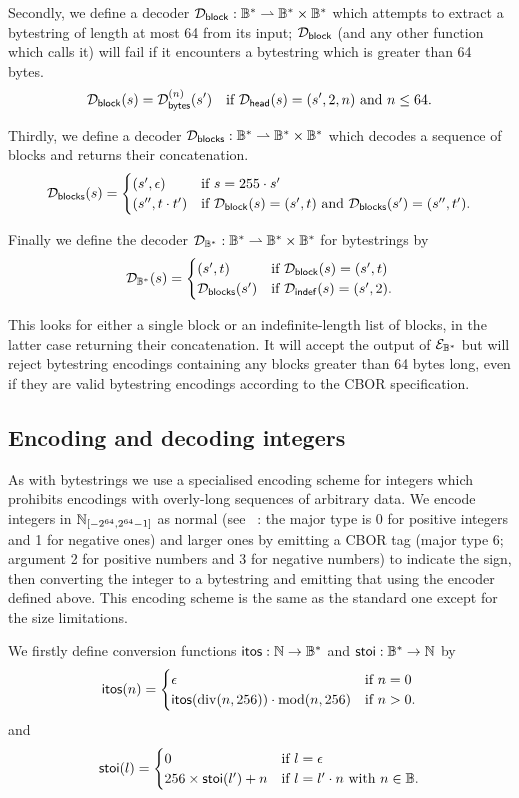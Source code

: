\noindent Secondly, we define a decoder $\mathcal{D}_{\mathsf{block}}: \mathbb{B}^* \rightharpoonup \mathbb{B}^*
\times \mathbb{B}^*$ which attempts to extract a bytestring of length at most 64
from its input; $\mathcal{D}_{\mathsf{block}}$ (and any other function which calls it) will
fail if it encounters a bytestring which is greater than 64 bytes.
$$
\mathcal{D}_{\mathsf{block}}(s) =
  \mathcal{D}_{\mathsf{bytes}}^{(n)}(s') \quad \text{if $\mathcal{D}_{\mathsf{head}}(s) = (s', 2,n)$ and $n \leq 64$}.
$$

\noindent Thirdly, we define a decoder $\mathcal{D}_{\mathsf{blocks}}: \mathbb{B}^* \rightharpoonup \mathbb{B}^*
\times \mathbb{B}^*$ which decodes a sequence of blocks and returns their concatenation.
$$
\mathcal{D}_{\mathsf{blocks}}(s) =
\begin{cases}
  (s', \epsilon) & \text{if $s = 255 \cdot s'$}\\
  (s'', t \cdot t') &
  \text{if $\mathcal{D}_{\mathsf{block}}(s) = (s', t)$
    and $\mathcal{D}_{\mathsf{blocks}}(s') = (s'', t')$}.
\end{cases}
$$

\noindent Finally we define the decoder $\mathcal{D}_{\mathbb{B}^*}: \mathbb{B}^* \rightharpoonup \mathbb{B}^*
\times \mathbb{B}^*$ for bytestrings by
$$
\mathcal{D}_{\mathbb{B}^*}(s) =
\begin{cases}
  (s', t) & \text{if $\mathcal{D}_{\mathsf{block}}(s) = (s', t)$}\\
  \mathcal{D}_{\mathsf{blocks}}(s') & \text{if $\mathcal{D}_{\mathsf{indef}}(s) = (s', 2)$}.
\end{cases}
$$

\noindent This looks for either a single block or an indefinite-length list of
blocks, in the latter case returning their concatenation.  It will accept the
output of $\mathcal{E}_{\mathbb{B}^*}$ but will reject bytestring encodings containing any blocks
greater than 64 bytes long, even if they are valid bytestring encodings
according to the CBOR specification.

\subsection{Encoding and decoding integers}
As with bytestrings we use a specialised encoding scheme for integers which
prohibits encodings with overly-long sequences of arbitrary data.  We encode
integers in $\mathbb{N}_{[-2^{64},2^{64}-1]}$ as normal (see ~\cite[\S
  3.1]{rfc8949-CBOR}: the major type is 0 for positive integers and 1 for
negative ones) and larger ones by emitting a CBOR tag (major type 6; argument 2
for positive numbers and 3 for negative numbers) to indicate the sign, then
converting the integer to a bytestring and emitting that using the encoder
defined above.  This encoding scheme is the same as the standard one except for
the size limitations.

\medskip
\noindent
We firstly define conversion functions $\mathsf{itos} : \mathbb{N} \rightarrow
\mathbb{B}^*$ and $\mathsf{stoi}: \mathbb{B}^* \rightarrow \mathbb{N}$ by
$$
\mathsf{itos}(n) =
\begin{cases}
  \epsilon & \text{if $n=0$}\\
  \mathsf{itos}(\operatorname{div}(n,256)) \cdot \operatorname{mod}(n,256) & \text{if $n>0$.}\\
\end{cases}
$$
\noindent and
$$
\mathsf{stoi}(l) =
\begin{cases}
  0 & \text{if $l = \epsilon$}\\
  256\times\mathsf{stoi}(l') + n & \text{if $l=l' \cdot n$ with $n \in \mathbb{B}$.}\\
\end{cases}
$$

